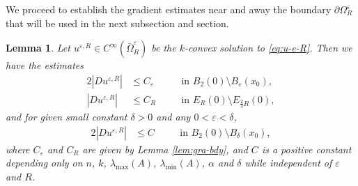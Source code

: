 \documentclass[reqno]{amsart}
\newtheorem{lemma}[theorem]{Lemma}
\theoremstyle{remark}
\theoremstyle{definition}
\numberwithin{equation}{section}
\begin{document}
We proceed to establish the gradient estimates near and away the boundary $\partial\Omega_R^\varepsilon$ that will be used in the next subsection and section.
\begin{lemma}\label{lem:near-bdy}
Let $u^{\varepsilon,R} \in C^\infty(\bar{\Omega}_R^\varepsilon)$ be the $k$-convex solution to \eqref{eq:u-e-R}. Then we have the estimates 
\begin{alignat}{2}
	|Du^{\varepsilon, R}| &\le C_\varepsilon \quad && \text{in } B_2(0) \setminus B_\varepsilon(x_0), \label{eq:C1-1}\\
	|Du^{\varepsilon, R}| &\le C_R           \quad && \text{in } E_R(0) \setminus E_{\frac{2}{3}R}(0), \label{eq:C1-2}
\end{alignat}
	and for given small constant $\delta>0$ and any $0<\varepsilon<\delta$,
\begin{alignat}{2}
	|Du^{\varepsilon, R}| &\le C             \quad && \text{in } B_{2}(0) \setminus B_\delta(x_0), \label{eq:C1-3}
\end{alignat}
where $C_\varepsilon$ and $C_R$ are given by Lemma \ref{lem:gra-bdy}, and $C$ is a positive constant depending only on $n$, $k$, $\lambda_{\mathrm{max}}(A)$, $\lambda_{\mathrm{min}}(A)$, $\alpha$ and $\delta$ while independent of $\varepsilon$ and $R$.
\end{lemma}
\end{document}
